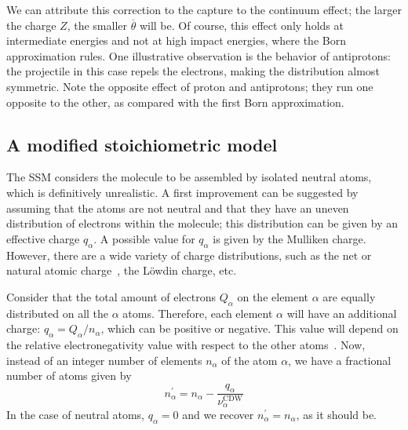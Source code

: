 \documentclass[preprint,12pt]{article}
\begin{document}
We can attribute this correction to the capture to the continuum effect;
the larger the charge $Z$, the smaller $\overline{\theta}$ will be. Of 
course, this effect only holds at intermediate energies and not at high 
impact energies, where the Born approximation rules. One illustrative 
observation is the behavior of antiprotons: the projectile in this case 
repels the electrons, making the distribution almost symmetric. 
Note the opposite effect of proton and antiprotons; they run one 
opposite to the other, as compared with the first Born approximation.

\subsection{A modified stoichiometric model}

The SSM considers the molecule to be assembled by isolated neutral atoms, 
which is definitively unrealistic. A first improvement can be suggested 
by assuming that the atoms are not neutral and that they have an uneven
distribution of electrons within the molecule; this distribution can be
given by an effective charge $q_{\alpha}$. A possible value for 
$q_{\alpha}$ is given by the Mulliken charge. However, there are a wide
variety of charge distributions, such as the net or natural atomic
charge~\cite{lee2003}, the L\"owdin charge, etc.

Consider that the total amount of electrons $Q_{\alpha }$ on the element
$\alpha$ are equally distributed on all the $\alpha$ atoms. Therefore, 
each element $\alpha$ will have an additional charge: 
$q_{\alpha}=Q_{\alpha}/n_{\alpha}$, which can be positive or negative.
This value will depend on the relative electronegativity value with 
respect to the other atoms~\cite{rappe1991}. Now, instead of an
integer number of elements $n_{\alpha}$ of the atom $\alpha$, we have a 
fractional number of atoms given by 
\begin{equation}
n_{\alpha }^{\prime }=n_{\alpha }-
\frac{q_{\alpha }}{\nu_{\alpha }^{\text{CDW}}}
\label{eq:newstoi}
\end{equation}%
In the case of neutral atoms, $q_{\alpha}=0$ and we recover 
$n_{\alpha}^{\prime}=n_{\alpha}$, as it should be.
\end{document}
